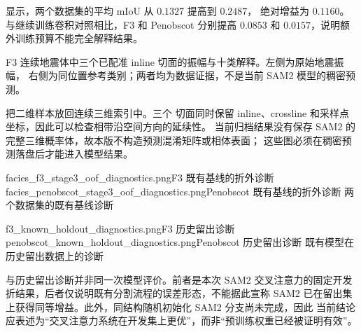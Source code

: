 显示，两个数据集的平均 mIoU 从 $0.1327$ 提高到 $0.2487$，
绝对增益为 $0.1160$。与继续训练卷积对照相比，F3 和 Penobscot 分别提高
$0.0853$ 和 $0.0157$，说明额外训练预算不能完全解释结果。

  {F3 连续地震体中三个已配准 inline 切面的振幅与十类解释。左侧为原始地震振幅，
  右侧为同位置参考类别；两者均为数据证据，不是当前 SAM2 模型的稠密预测。}

把二维样本放回连续三维索引中。三个
切面同时保留 inline、crossline 和采样点坐标，因此可以检查相带沿空间方向的延续性。
当前归档结果没有保存 SAM2 的完整三维概率体，故本版不构造预测混淆矩阵或相体表面；
这些图必须在稠密预测落盘后才能进入模型结果。

  {facies_f3_stage3_oof_diagnostics.png}{F3 既有基线的折外诊断}
  {facies_penobscot_stage3_oof_diagnostics.png}{Penobscot 既有基线的折外诊断}
  {两个数据集的既有基线诊断}

  {f3_known_holdout_diagnostics.png}{F3 历史留出诊断}
  {penobscot_known_holdout_diagnostics.png}{Penobscot 历史留出诊断}
  {既有模型在历史留出数据上的诊断}

与历史留出诊断并非同一次模型评价。前者是本次
SAM2 交叉注意力的固定开发折结果，后者仅说明既有分割流程的误差形态，不能据此宣称
SAM2 已在留出集上获得同等增益。此外，同结构随机初始化 SAM2 分支尚未完成，因此
当前结论应表述为“交叉注意力系统在开发集上更优”，而非“预训练权重已经被证明有效”。

\FloatBarrier

